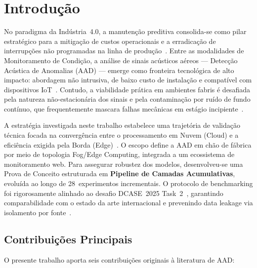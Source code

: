\section{Introdução}

\color{black}

No paradigma da Indústria~4.0, a manutenção preditiva consolida-se como pilar estratégico para a
mitigação de custos operacionais e a erradicação de interrupções não programadas na linha de
produção~\cite{Khamaisi2025, Le2025}. Entre as modalidades de Monitoramento de Condição, a análise
de sinais acústicos aéreos --- Detecção Acústica de Anomalias (AAD) --- emerge como fronteira
tecnológica de alto impacto: abordagem não intrusiva, de baixo custo de instalação e compatível com
dispositivos IoT~\cite{Zhang2026, Uzel2026}. Contudo, a viabilidade prática em ambientes fabris é
desafiada pela natureza não-estacionária dos sinais e pela contaminação por ruído de fundo contínuo,
que frequentemente mascara falhas mecânicas em estágio incipiente~\cite{Bi2026, Ali2025}.

A estratégia investigada neste trabalho estabelece uma trajetória de validação técnica focada na
convergência entre o processamento em Nuvem (Cloud) e a eficiência exigida pela Borda
(Edge)~\cite{Uzel2026}. O escopo define a AAD em chão de fábrica por meio de topologia Fog/Edge
Computing, integrada a um ecossistema de monitoramento web. Para assegurar robustez dos modelos,
desenvolveu-se uma Prova de Conceito estruturada em \textbf{Pipeline de Camadas Acumulativas},
evoluída ao longo de 28~experimentos incrementais. O protocolo de benchmarking foi rigorosamente
alinhado ao desafio DCASE~2025 Task~2~\cite{Nishida2025}, garantindo comparabilidade com o estado da
arte internacional e prevenindo data leakage via isolamento por fonte~\cite{Harada2023, Dohi2022}.

\subsection{Contribuições Principais}

O presente trabalho aporta seis contribuições originais à literatura de AAD:

